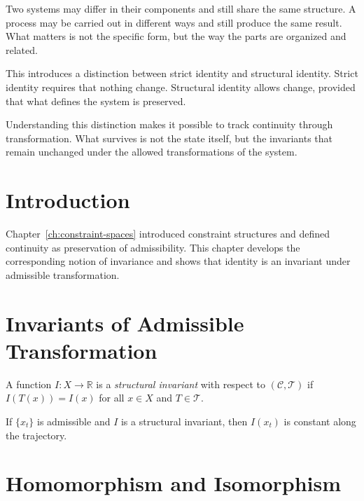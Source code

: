 \documentclass[11pt,openany]{book}
\begin{document}
Two systems may differ in their components and still share the same structure. A process may be carried out in different ways and still produce the same result. What matters is not the specific form, but the way the parts are organized and related.

This introduces a distinction between strict identity and structural identity. Strict identity requires that nothing change. Structural identity allows change, provided that what defines the system is preserved.

Understanding this distinction makes it possible to track continuity through transformation. What survives is not the state itself, but the invariants that remain unchanged under the allowed transformations of the system.

\section{Introduction}
\label{sec:introduction-invariance}

Chapter~\ref{ch:constraint-spaces} introduced constraint
structures and defined continuity as preservation of
admissibility. This chapter develops the corresponding
notion of invariance and shows that identity is an
invariant under admissible transformation.

\section{Invariants of Admissible Transformation}
\label{sec:invariants}

\begin{definition}
\label{def:structural-invariant}
A function $I : X \to \mathbb{R}$ is a
\emph{structural invariant} with respect to $(\mathcal{C},
\mathcal{T})$ if $I(T(x)) = I(x)$ for all $x \in X$ and
$T \in \mathcal{T}$.
\end{definition}

\begin{proposition}
\label{prop:trajectory-invariance}
If $\{x_t\}$ is admissible and $I$ is a structural
invariant, then $I(x_t)$ is constant along the trajectory.
\end{proposition}

\section{Homomorphism and Isomorphism}
\label{sec:homomorphism}
\end{document}

